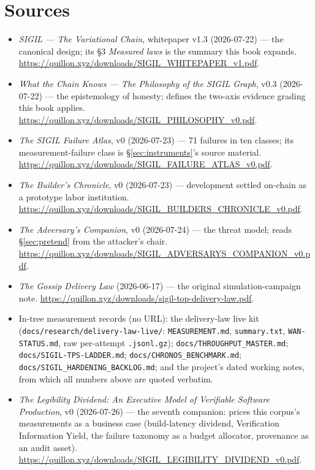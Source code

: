 \documentclass[10pt,a4paper]{article}
\begin{document}
\section*{Sources}
\label{sec:sources}
\small
\begin{itemize}[leftmargin=1.2em,itemsep=1pt]
\item \emph{SIGIL --- The Variational Chain}, whitepaper v1.3 (2026-07-22) --- the canonical
design; its \S3 \emph{Measured laws} is the summary this book expands.
\url{https://quillon.xyz/downloads/SIGIL_WHITEPAPER_v1.pdf}.
\item \emph{What the Chain Knows --- The Philosophy of the SIGIL Graph}, v0.3 (2026-07-22) ---
the epistemology of honesty; defines the two-axis evidence grading this book applies.
\url{https://quillon.xyz/downloads/SIGIL_PHILOSOPHY_v0.pdf}.
\item \emph{The SIGIL Failure Atlas}, v0 (2026-07-23) --- 71 failures in ten classes; its
measurement-failure class is \S\ref{sec:instruments}'s source material.
\url{https://quillon.xyz/downloads/SIGIL_FAILURE_ATLAS_v0.pdf}.
\item \emph{The Builder's Chronicle}, v0 (2026-07-23) --- development settled on-chain as a
prototype labor institution.
\url{https://quillon.xyz/downloads/SIGIL_BUILDERS_CHRONICLE_v0.pdf}.
\item \emph{The Adversary's Companion}, v0 (2026-07-24) --- the threat model; reads
\S\ref{sec:pretend} from the attacker's chair.
\url{https://quillon.xyz/downloads/SIGIL_ADVERSARYS_COMPANION_v0.pdf}.
\item \emph{The Gossip Delivery Law} (2026-06-17) --- the original simulation-campaign
note. \url{https://quillon.xyz/downloads/sigil-top-delivery-law.pdf}.
\item In-tree measurement records (no URL): the delivery-law live kit
(\texttt{docs/research/delivery-law-live/}: \texttt{MEASUREMENT.md},
\texttt{summary.txt}, \texttt{WAN-STATUS.md}, raw per-attempt \texttt{.jsonl.gz});
\texttt{docs/THROUGHPUT\_MASTER.md}; \texttt{docs/SIGIL-TPS-LADDER.md};
\texttt{docs/CHRONOS\_BENCHMARK.md}; \texttt{docs/SIGIL\_HARDENING\_BACKLOG.md}; and the
project's dated working notes, from which all numbers above are quoted verbatim.
\item \emph{The Legibility Dividend: An Executive Model of Verifiable Software Production}, v0 (2026-07-26) --- the seventh companion: prices this corpus's measurements as a business case (build-latency dividend, Verification Information Yield, the failure taxonomy as a budget allocator, provenance as an audit asset). \url{https://quillon.xyz/downloads/SIGIL_LEGIBILITY_DIVIDEND_v0.pdf}.
\end{itemize}
\end{document}
